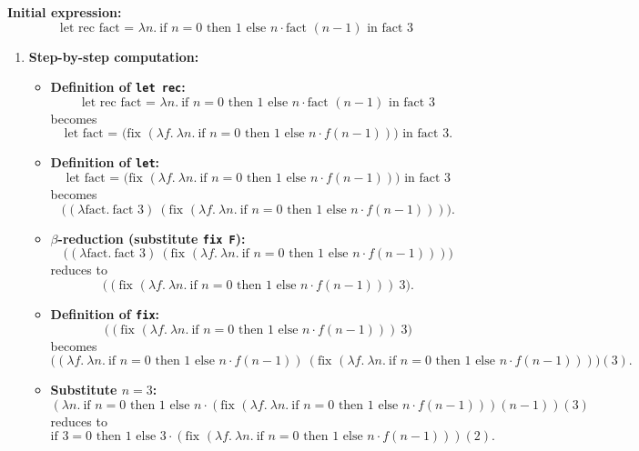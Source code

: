 \documentclass{article}
\theoremstyle{theorem}
\theoremstyle{definition}
\theoremstyle{remark}
\begin{document}
\textbf{Initial expression:}
\[
\text{let rec fact = } \lambda n.\ \text{if } n = 0 \text{ then } 1 \text{ else } n \cdot \text{fact } (n-1) \text{ in fact 3}
\]

\begin{enumerate}
    \item \textbf{Step-by-step computation:}
    \begin{itemize}
        \item \textbf{Definition of \texttt{let rec}:}
        \[
        \text{let rec fact = } \lambda n.\ \text{if } n = 0 \text{ then } 1 \text{ else } n \cdot \text{fact } (n-1) \text{ in fact 3}
        \]
        becomes
        \[
        \text{let fact = (fix } (\lambda f.\ \lambda n.\ \text{if } n = 0 \text{ then } 1 \text{ else } n \cdot f (n-1)) \text{) in fact 3.}
        \]

        \item \textbf{Definition of \texttt{let}:}
        \[
        \text{let fact = (fix } (\lambda f.\ \lambda n.\ \text{if } n = 0 \text{ then } 1 \text{ else } n \cdot f (n-1)) \text{) in fact 3}
        \]
        becomes
        \[
        \big((\lambda \text{fact}.\ \text{fact } 3)\ (\text{fix } (\lambda f.\ \lambda n.\ \text{if } n = 0 \text{ then } 1 \text{ else } n \cdot f (n-1)))\big).
        \]

        \item \textbf{\(\beta\)-reduction (substitute \texttt{fix F}):}
        \[
        \big((\lambda \text{fact}.\ \text{fact } 3)\ (\text{fix } (\lambda f.\ \lambda n.\ \text{if } n = 0 \text{ then } 1 \text{ else } n \cdot f (n-1)))\big)
        \]
        reduces to
        \[
        \big((\text{fix } (\lambda f.\ \lambda n.\ \text{if } n = 0 \text{ then } 1 \text{ else } n \cdot f (n-1)))\ 3\big).
        \]

        \item \textbf{Definition of \texttt{fix}:}
        \[
        \big((\text{fix } (\lambda f.\ \lambda n.\ \text{if } n = 0 \text{ then } 1 \text{ else } n \cdot f (n-1)))\ 3\big)
        \]
        becomes
        \[
        \big((\lambda f.\ \lambda n.\ \text{if } n = 0 \text{ then } 1 \text{ else } n \cdot f (n-1))\ (\text{fix } (\lambda f.\ \lambda n.\ \text{if } n = 0 \text{ then } 1 \text{ else } n \cdot f (n-1)))\big)(3).
        \]

        \item \textbf{Substitute \(n = 3\):}
        \[
        (\lambda n.\ \text{if } n = 0 \text{ then } 1 \text{ else } n \cdot (\text{fix } (\lambda f.\ \lambda n.\ \text{if } n = 0 \text{ then } 1 \text{ else } n \cdot f (n-1)))(n-1))(3)
        \]
        reduces to
        \[
        \text{if } 3 = 0 \text{ then } 1 \text{ else } 3 \cdot (\text{fix } (\lambda f.\ \lambda n.\ \text{if } n = 0 \text{ then } 1 \text{ else } n \cdot f (n-1)))(2).
        \]


\end{itemize}
\end{enumerate}
\end{document}
